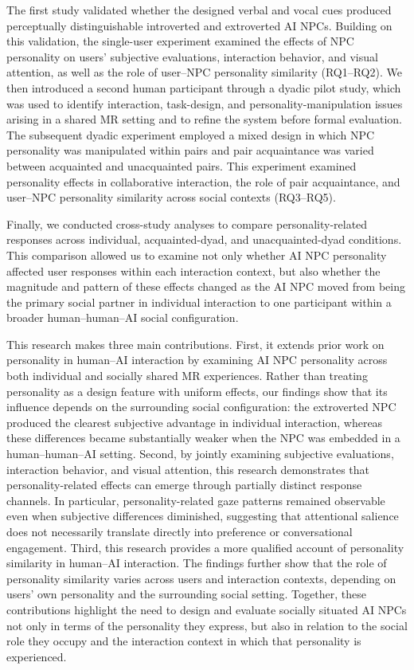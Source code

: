 \documentclass[a4paper,fleqn]{cas-sc}
\begin{document}
The first study validated whether the designed verbal and vocal cues produced perceptually distinguishable introverted and extroverted AI NPCs. Building on this validation, the single-user experiment examined the effects of NPC personality on users' subjective evaluations, interaction behavior, and visual attention, as well as the role of user--NPC personality similarity (RQ1--RQ2). We then introduced a second human participant through a dyadic pilot study, which was used to identify interaction, task-design, and personality-manipulation issues arising in a shared MR setting and to refine the system before formal evaluation. The subsequent dyadic experiment employed a mixed design in which NPC personality was manipulated within pairs and pair acquaintance was varied between acquainted and unacquainted pairs. This experiment examined personality effects in collaborative interaction, the role of pair acquaintance, and user--NPC personality similarity across social contexts (RQ3--RQ5).

Finally, we conducted cross-study analyses to compare personality-related responses across individual, acquainted-dyad, and unacquainted-dyad conditions. This comparison allowed us to examine not only whether AI NPC personality affected user responses within each interaction context, but also whether the magnitude and pattern of these effects changed as the AI NPC moved from being the primary social partner in individual interaction to one participant within a broader human--human--AI social configuration.


This research makes three main contributions. First, it extends prior work on personality in human--AI interaction by examining AI NPC personality across both individual and socially shared MR experiences. Rather than treating personality as a design feature with uniform effects, our findings show that its influence depends on the surrounding social configuration: the extroverted NPC produced the clearest subjective advantage in individual interaction, whereas these differences became substantially weaker when the NPC was embedded in a human--human--AI setting. Second, by jointly examining subjective evaluations, interaction behavior, and visual attention, this research demonstrates that personality-related effects can emerge through partially distinct response channels. In particular, personality-related gaze patterns remained observable even when subjective differences diminished, suggesting that attentional salience does not necessarily translate directly into preference or conversational engagement. Third, this research provides a more qualified account of personality similarity in human--AI interaction. The findings further show that the role of personality similarity varies across users and interaction contexts, depending on users' own personality and the surrounding social setting. Together, these contributions highlight the need to design and evaluate socially situated AI NPCs not only in terms of the personality they express, but also in relation to the social role they occupy and the interaction context in which that personality is experienced.
\end{document}
